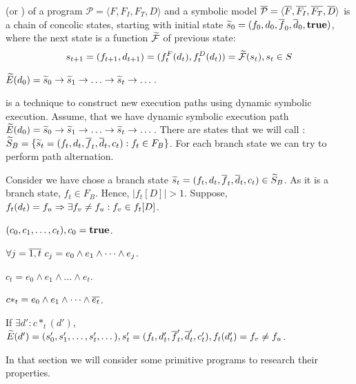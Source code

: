 (or )
of a program $\mathcal{P} = \langle F, F_I, F_T, D \rangle$
and a symbolic model
$\overline{\mathcal{P}} = \langle \overline{F}, \overline{F_I}, \overline{F_T}, \overline{D} \rangle$
is a chain of concolic states, starting with initial state
$\widetilde{s}_0 = (f_0, d_0, \overline{f}_0, \overline{d}_0, \textbf{true})$,
where the next state is a function $\widetilde{\mathcal{F}}$ of previous state:
\[s_{t + 1} = (f_{t + 1}, d_{t + 1}) = (f_t^F(d_t), f_t^D(d_t)) =
    \widetilde{\mathcal{F}}(s_t), s_t \in S\]

$\dse{E}(d_0) = \dse{s}_0 \ra \dse{s}_1 \ra \dots \ra \dse{s}_t \ra \dots$.


is a technique
to construct new execution paths using dynamic symbolic execution.
Assume, that we have dynamic symbolic execution path
$\dse{E}(d_0) = \dse{s}_0 \ra \dse{s}_1 \ra \dots \ra \dse{s}_t \ra \dots$.
There are states that we will call :
$\widetilde{S}_B = \{\widetilde{s}_t = (f_t, d_t, \overline{f}_t, \overline{d}_t, c_t) :
f_t \in F_B\}$.
For each branch state we can try to perform path alternation.

Consider we have chose a branch state
$\widetilde{s}_t = (f_t, d_t, \overline{f}_t, \overline{d}_t, c_t) \in \widetilde{S}_B$.
As it is a branch state, $f_t \in F_B$.
Hence, $|f_t[D]| > 1$.
Suppose, $f_t(d_t) = f_u \Rightarrow \exists f_v \neq f_u: f_v \in f_t[D]$.

$(c_0, c_1, \dots, c_t), c_0 = \textbf{true}$.

$\forall j = \overline{1, t} \,\, c_j = e_0 \land e_1 \land \dots \land e_j$.

$c_t = e_0 \land e_1 \land \dots \land e_t$.

$c*_t = e_0 \land e_1 \land \dots \land \overline{e_t}$.

\begin{lemma}
    If $\exists d': c*_t(d')$,
    $\widetilde{E}(d') = (s'_0, s'_1, \dots, s'_t, \dots),
    s'_t = (f_t, d'_t, \overline{f}'_t, \overline{d}'_t, c'_t),
    f_t(d'_t) = f_v \neq f_u$.
\end{lemma}




In that section we will consider some primitive programs
to research their properties.



